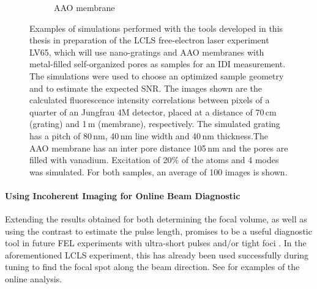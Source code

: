 \begin{figure}[p]
\begin{subfigure}[b]{0.37\textwidth}
		\caption{AAO membrane  }
		\label{fig:outlook_aao}
	\end{subfigure}
	\caption[Simulations in preparation of LCLS experiment]{Examples of simulations performed with the tools developed in this thesis in preparation of the LCLS free-electron laser experiment LV65, which will use nano-gratings and AAO membranes with metal-filled self-organized pores as samples for an IDI measurement. The simulations were used to choose an optimized sample geometry and to estimate the expected SNR. The images shown are the calculated fluorescence intensity correlations between pixels of a quarter of an Jungfrau 4M detector, placed at a distance of 70\,cm (grating) and 1\,m (membrane), respectively. The simulated grating has a pitch of 80\,nm, 40\,nm line width and 40\,nm thickness.The AAO membrane has an inter pore distance 105\,nm and the pores are filled with vanadium.
		Excitation of 20\% of the atoms and 4 modes was simulated. For both samples, an average of 100 images is shown.}
\end{figure}


\paragraph{Using Incoherent Imaging for Online Beam Diagnostic}
Extending the results obtained for both determining the focal volume, as well as using the contrast to estimate the pulse length, promises to be a useful diagnostic tool in future FEL experiments with ultra-short pulses and/or tight foci \cite{nakumura2020,inoue2019}. In the aforementioned LCLS experiment, this has already been used successfully during tuning to find the focal spot along the beam direction. See  for examples of the online analysis.


